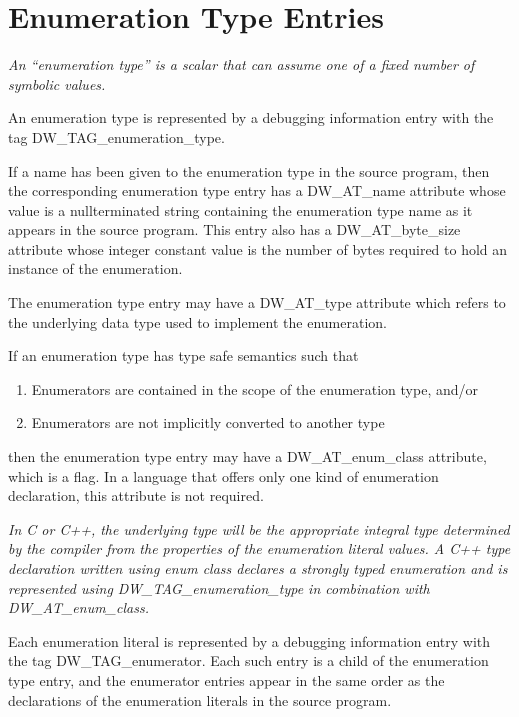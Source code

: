 \section{Enumeration Type Entries}
\label{chap:enumerationtypeentries}

\textit{An “enumeration type” is a scalar that can assume one of
a fixed number of symbolic values.}

An enumeration type is represented by a debugging information
entry with the tag DW\_TAG\_enumeration\_type.

If a name has been given to the enumeration type in the source
program, then the corresponding enumeration type entry has
a DW\_AT\_name attribute whose value is a null\dash terminated
string containing the enumeration type name as it appears
in the source program. This entry also has a DW\_AT\_byte\_size
attribute whose integer constant value is the number of bytes
required to hold an instance of the enumeration.

The enumeration type entry may have a DW\_AT\_type attribute
which refers to the underlying data type used to implement
the enumeration.

If an enumeration type has type safe semantics such that

\begin{enumerate}[1.]
\item Enumerators are contained in the scope of the enumeration type, and/or

\item Enumerators are not implicitly converted to another type
\end{enumerate}

then the enumeration type entry may have a DW\_AT\_enum\_class
attribute, which is a flag. In a language that offers only
one kind of enumeration declaration, this attribute is not
required.

\textit{In C or C++, the underlying type will be the appropriate
integral type determined by the compiler from the properties of
the enumeration literal values. A C++ type declaration written
using enum class declares a strongly typed enumeration and
is represented using DW\_TAG\_enumeration\_type in combination
with DW\_AT\_enum\_class.}

Each enumeration literal is represented by a debugging
information entry with the tag DW\_TAG\_enumerator. Each
such entry is a child of the enumeration type entry, and the
enumerator entries appear in the same order as the declarations
of the enumeration literals in the source program.

